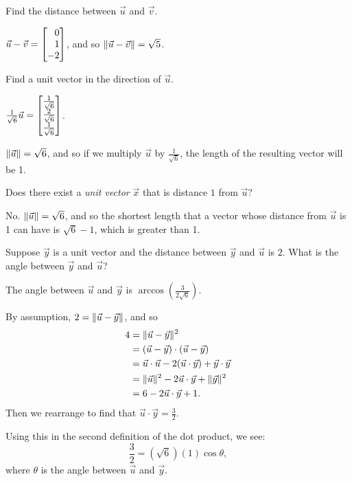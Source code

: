 	\begin{parts}
		\item Find the distance between $\vec u$ and $\vec v$.
			\begin{solution}
				$\vec u - \vec v = \mat{0\\1\\-2}$, and so $\lVert\vec u-\vec v\rVert = \sqrt{5}$.
			\end{solution}
		\item Find a unit vector in the direction of $\vec u$.
			\begin{solution}
				$\frac{1}{\sqrt{6}} \vec u = \mat{\frac{1}{\sqrt{6}}\\\frac{2}{\sqrt{6}}\\\frac{1}{\sqrt{6}}}$.

				$\lVert\vec u\rVert = \sqrt{6}$, and so if we multiply $\vec u$ by $\frac{1}{\sqrt{6}}$,
				the length of the resulting vector will be 1.
			\end{solution}
		\item Does there exist a \emph{unit vector} $\vec x$ that is distance
			$1$ from $\vec u$?
			\begin{solution}
				No. $\lVert\vec u\rVert = \sqrt{6}$, and so the shortest length that a
				vector whose distance from $\vec u$ is 1 can have is $\sqrt{6} - 1$,
				which is greater than 1.
			\end{solution}
		\item Suppose $\vec y$ is a unit vector and the distance between $\vec y$
			and	$\vec u$ is $2$. What is the angle between $\vec y$ and $\vec u$?
			\begin{solution}
				The angle between $\vec u$ and $\vec y$ is $\arccos\left(\frac{3}{2\sqrt{6}}\right)$.

				By assumption, $2=\lVert\vec u-\vec y\rVert$, and so
				\begin{align*}
					4 &= \lVert\vec u-\vec y\rVert^2\\
					&= (\vec u-\vec y)\cdot(\vec u-\vec y)\\
					&= \vec u\cdot\vec u - 2(\vec u\cdot\vec y) + \vec y\cdot\vec y\\
					&=\lVert\vec u\rVert^2 - 2\vec u\cdot\vec y + \lVert\vec y\rVert^2\\
					&=6 - 2\vec u\cdot\vec y + 1.
				\end{align*}
				Then we rearrange to find that $\vec u\cdot \vec y = \frac{3}{2}$.

				Using this in the second definition of the dot product, we see:
				\[
					\frac{3}{2} = \left(\sqrt{6}\right)(1) \cos \theta,
				\]
				where $\theta$ is the angle between $\vec u$ and $\vec y$.
			\end{solution}
	\end{parts}

